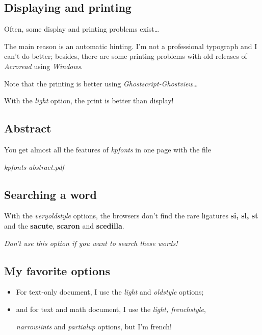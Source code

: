 \documentclass[a4paper,11pt]{article}
\begin{document}
\subsection{Displaying and printing}

Often, some display and printing problems exist\dots

The main reason is an automatic hinting. I'm not a professional typograph and I can't do better;
besides, there are some printing problems with old releases of \textit{Acroread}\textregistered{} using \textit{Windows}\textregistered.

Note that the printing is better using \textit{Ghostscript-Ghostview}\textregistered\dots

With the \textit{light} option, the print is better than display!

\subsection{Abstract}

You get almost all the features of \textit{kpfonts} in one page with the file

\begin{center}\textit{kpfonts-abstract.pdf}\end{center}

\subsection{Searching a word}

With the \textit{veryoldstyle} options, the browsers don't find the rare ligatures \textbf{si, sl, st} and the \textbf{sacute}, \textbf{scaron} and \textbf{scedilla}. 

\begin{center}
\textit{Don't use this option if you want to search these words!}
\end{center}

\subsection{My favorite options}

\begin{itemize}
	\item For text-only document, I use the \textit{light} and \textit{oldstyle} options;
	\item and for text and math document, I use the \textit{light, frenchstyle},
				
				\textit{narrowiints} and \textit{partialup} options, but I'm french!
\end{itemize}
\end{document}
